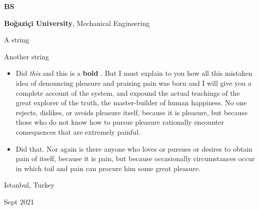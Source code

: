 \documentclass[10pt, letterpaper]{article}
\newenvironment{summary}{
    \begin{description}[
        topsep=0.10 cm,
        parsep=0.10 cm,
        partopsep=0pt,
        itemsep=0pt,
        leftmargin=0.4 cm + 10pt
    ]
}{
    \end{description}
} %
\newenvironment{highlights}{
    \begin{itemize}[
        topsep=0.10 cm,
        parsep=0.10 cm,
        partopsep=0pt,
        itemsep=0pt,
        leftmargin=0.4 cm + 10pt
    ]
}{
    \end{itemize}
} %
\newenvironment{threecolentry}[3][]{
    \onecolentry
    \def\thirdColumn{#3}
    \setcolumnwidth{1 cm, \fill, 4.5 cm}
    \begin{paracol}{3}
    {\raggedright #2} \switchcolumn
}{
    \switchcolumn \raggedleft \thirdColumn
    \end{paracol}
    \endonecolentry
} %
\let\hrefWithoutArrow\href
\renewcommand{\href}[2]{\hrefWithoutArrow{#1}{\ifthenelse{\equal{#2}{}}{ }{#2 }\raisebox{.15ex}{\footnotesize \faExternalLink*}}}
\begin{document}
        \begin{threecolentry}{\textbf{BS}}{
            Istanbul, Turkey

        Sept 2021
        }
            \textbf{Boğaziçi University}, Mechanical Engineering
            \begin{summary}
                \item A string
                \item Another string
            \end{summary}
            \begin{highlights}
                \item Did \textit{this} and this is a \textbf{bold} \href{https://example.com}{link}. But I must explain to you how all this mistaken idea of denouncing pleasure and praising pain was born and I will give you a complete account of the system, and expound the actual teachings of the great explorer of the truth, the master-builder of human happiness. No one rejects, dislikes, or avoids pleasure itself, because it is pleasure, but because those who do not know how to pursue pleasure rationally encounter consequences that are extremely painful.
                \item Did that. Nor again is there anyone who loves or pursues or desires to obtain pain of itself, because it is pain, but because occasionally circumstances occur in which toil and pain can procure him some great pleasure.
            \end{highlights}
        \end{threecolentry}

        \vspace{0.2 cm}
\end{document}
